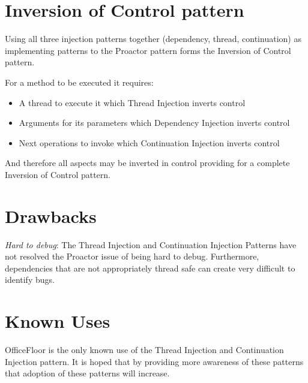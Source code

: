 \documentclass{article}
\begin{document}
\section{Inversion of Control pattern}

Using all three injection patterns together (dependency, thread, continuation)
as implementing patterns to the Proactor pattern forms the Inversion of Control
pattern.

For a method to be executed it requires:
\begin{itemize}
  \item A thread to execute it which Thread Injection inverts control
  \item Arguments for its parameters which Dependency Injection inverts control
  \item Next operations to invoke which Continuation Injection inverts control
\end{itemize}

And therefore all aspects may be inverted in control providing for a complete
Inversion of Control pattern.

\section{Drawbacks}

\emph{Hard to debug}: The Thread Injection and Continuation Injection Patterns
have not resolved the Proactor issue of being hard to debug.  Furthermore,
dependencies that are not appropriately thread safe can create very difficult to
identify bugs.

\section{Known Uses}

OfficeFloor \cite{officefloor} is the only known use of the Thread Injection and
Continuation Injection pattern.  It is hoped that by providing more awareness of
these patterns that adoption of these patterns will increase.




\end{document}
